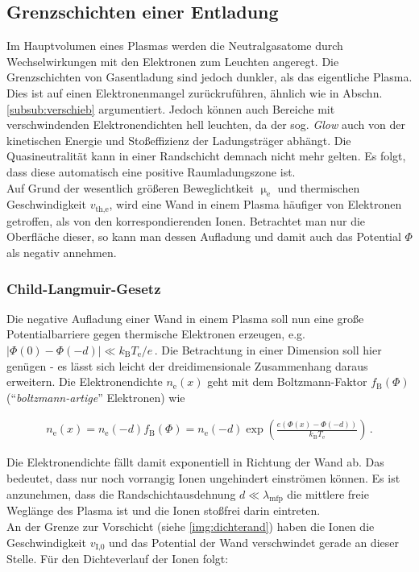 \documentclass[numbers=noenddot,a4paper]{scrartcl}
\newcommand{\ix}[1]{_\text{#1}}
\newcommand{\tilt}[1]{\textit{#1}}
\begin{document}
		\subsection{Grenzschichten einer Entladung}\label{sub:rand}

			Im Hauptvolumen eines Plasmas werden die Neutralgasatome durch Wechselwirkungen mit den Elektronen zum Leuchten angeregt. Die Grenzschichten von Gasentladung sind jedoch dunkler, als das eigentliche Plasma. Dies ist auf einen Elektronenmangel zur\"uckruf\"uhren, ähnlich wie in Abschn. \ref{subsub:verschieb} argumentiert. Jedoch können auch Bereiche mit verschwindenden Elektronendichten hell leuchten, da der sog. \tilt{Glow} auch von der kinetischen Energie und Stoßeffizienz der Ladungsträger abhängt. Die Quasineutralit\"at kann in einer Randschicht demnach nicht mehr gelten. Es folgt, dass diese automatisch eine positive Raumladungszone ist. \\
			Auf Grund der wesentlich gr\"o{\ss}eren Beweglichtkeit $\upmu\ix{e}$ und thermischen Geschwindigkeit $v\ix{th,e}$, wird eine Wand in einem Plasma h\"aufiger von Elektronen getroffen, als von den korrespondierenden Ionen. Betrachtet man nur die Oberfl\"ache dieser, so kann man dessen Aufladung und damit auch das Potential $\Phi$ als negativ annehmen.

		\subsubsection{Child-Langmuir-Gesetz} \label{subsub:childlang}

		Die negative Aufladung einer Wand in einem Plasma soll nun eine große Potentialbarriere gegen thermische Elektronen erzeugen, e.g. $|\Phi\left(0\right)-\Phi\left(-d\right)|\ll k\ix{B}T\ix{e}/e\,$. Die Betrachtung in einer Dimension soll hier genügen - es lässt sich leicht der dreidimensionale Zusammenhang daraus erweitern. Die Elektronendichte $n\ix{e}\left(x\right)$ geht mit dem Boltzmann-Faktor $f\ix{B}\left(\Phi\right)$ ("`\tilt{boltzmann-artige}"' Elektronen) wie

			\begin{align}
				n\ix{e}\left(x\right)=n\ix{e}\left(-d\right)f\ix{B}\left(\Phi\right)=n\ix{e}\left(-d\right)\exp\left(\frac{e\left(\Phi\left(x\right)-\Phi\left(-d\right)\right)}{k\ix{B}T\ix{e}}\right) \, . \label{eq:randschichtdichte}
			\end{align}

		Die Elektronendichte fällt damit exponentiell in Richtung der Wand ab. Das bedeutet, dass nur noch vorrangig Ionen ungehindert einströmen können. Es ist anzunehmen, dass die Randschichtausdehnung $d\ll\lambda\ix{mfp}$ die mittlere freie Weglänge des Plasma ist und die Ionen stoßfrei darin eintreten.\\
		An der Grenze zur Vorschicht (siehe \ref{img:dichterand}) haben die Ionen die Geschwindigkeit $v\ix{I,0}$ und das Potential der Wand verschwindet gerade an dieser Stelle. Für den Dichteverlauf der Ionen folgt:
\end{document}
